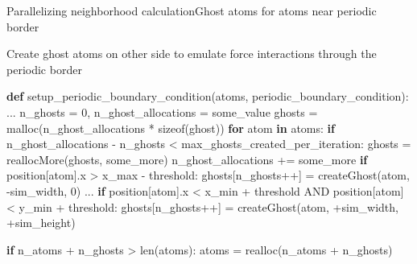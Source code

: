 \documentclass[ignorenonframetext,aspectratio=169]{beamer}
\newenvironment{Shaded}{}{}
\newcommand{\BuiltInTok}[1]{#1}
\newcommand{\ControlFlowTok}[1]{\textcolor[rgb]{0.00,0.44,0.13}{\textbf{#1}}}
\newcommand{\DecValTok}[1]{\textcolor[rgb]{0.25,0.63,0.44}{#1}}
\newcommand{\KeywordTok}[1]{\textcolor[rgb]{0.00,0.44,0.13}{\textbf{#1}}}
\newcommand{\NormalTok}[1]{#1}
\newcommand{\OperatorTok}[1]{\textcolor[rgb]{0.40,0.40,0.40}{#1}}
\begin{document}
\begin{frame}[fragile]{Parallelizing neighborhood calculation}{Ghost atoms for atoms near periodic border}
    
    Create ghost atoms on other side to emulate force interactions through
    the periodic border
    
    \begin{scriptsize}
        \begin{Shaded}
            \begin{Highlighting}[]
\KeywordTok{def}\NormalTok{ setup_periodic_boundary_condition(atoms, periodic_boundary_condition):}
\NormalTok{  ...}
\NormalTok{  n_ghosts }\OperatorTok{=} \DecValTok{0}\NormalTok{, }\NormalTok{  n_ghost_allocations }\OperatorTok{=}\NormalTok{ some_value}
\NormalTok{  ghosts }\OperatorTok{=}\NormalTok{ malloc(n_ghost_allocations }\OperatorTok{*}\NormalTok{ sizeof(ghost))}
  \ControlFlowTok{for}\NormalTok{ atom }\KeywordTok{in}\NormalTok{ atoms:}
    \ControlFlowTok{if}\NormalTok{ n_ghost_allocations }\OperatorTok{-}\NormalTok{ n_ghosts }\OperatorTok{<}\NormalTok{ max_ghosts_created_per_iteration:}
\NormalTok{      ghosts }\OperatorTok{=}\NormalTok{ reallocMore(ghosts, some_more)}
\NormalTok{      n_ghost_allocations }\OperatorTok{+=}\NormalTok{ some_more}
    \ControlFlowTok{if}\NormalTok{ position[atom].x }\OperatorTok{>}\NormalTok{ x_max }\OperatorTok{-}\NormalTok{ threshold:}
\NormalTok{      ghosts[n_ghosts}\OperatorTok{++}\NormalTok{] }\OperatorTok{=}\NormalTok{ createGhost(atom, }\OperatorTok{-}\NormalTok{sim_width, }\DecValTok{0}\NormalTok{)}
\NormalTok{    ...}
    \ControlFlowTok{if}\NormalTok{ position[atom].x }\OperatorTok{<}\NormalTok{ x_min }\OperatorTok{+}\NormalTok{ threshold AND position[atom] }\OperatorTok{<}\NormalTok{ y_min }\OperatorTok{+}\NormalTok{ threshold:}
\NormalTok{      ghosts[n_ghosts}\OperatorTok{++}\NormalTok{] }\OperatorTok{=}\NormalTok{ createGhost(atom, }\OperatorTok{+}\NormalTok{sim_width, }\OperatorTok{+}\NormalTok{sim_height)}
  
  \ControlFlowTok{if}\NormalTok{ n_atoms }\OperatorTok{+}\NormalTok{ n_ghosts }\OperatorTok{>} \BuiltInTok{len}\NormalTok{(atoms):}
\NormalTok{    atoms }\OperatorTok{=}\NormalTok{ realloc(n_atoms }\OperatorTok{+}\NormalTok{ n_ghosts)}
            \end{Highlighting}
        \end{Shaded}
    \end{scriptsize}
\end{frame}
\end{document}
